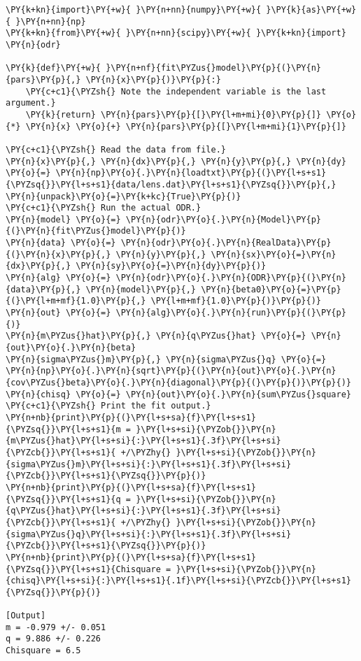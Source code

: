 \begin{Verbatim}[label=\makebox{\href{https://github.com/unipi-physics-labs/statnotes/tree/main/snippy/odr.py}{https://github.com/.../odr.py}},commandchars=\\\{\}]
\PY{k+kn}{import}\PY{+w}{ }\PY{n+nn}{numpy}\PY{+w}{ }\PY{k}{as}\PY{+w}{ }\PY{n+nn}{np}
\PY{k+kn}{from}\PY{+w}{ }\PY{n+nn}{scipy}\PY{+w}{ }\PY{k+kn}{import} \PY{n}{odr}

\PY{k}{def}\PY{+w}{ }\PY{n+nf}{fit\PYZus{}model}\PY{p}{(}\PY{n}{pars}\PY{p}{,} \PY{n}{x}\PY{p}{)}\PY{p}{:}
    \PY{c+c1}{\PYZsh{} Note the independent variable is the last argument.}
    \PY{k}{return} \PY{n}{pars}\PY{p}{[}\PY{l+m+mi}{0}\PY{p}{]} \PY{o}{*} \PY{n}{x} \PY{o}{+} \PY{n}{pars}\PY{p}{[}\PY{l+m+mi}{1}\PY{p}{]}

\PY{c+c1}{\PYZsh{} Read the data from file.}
\PY{n}{x}\PY{p}{,} \PY{n}{dx}\PY{p}{,} \PY{n}{y}\PY{p}{,} \PY{n}{dy} \PY{o}{=} \PY{n}{np}\PY{o}{.}\PY{n}{loadtxt}\PY{p}{(}\PY{l+s+s1}{\PYZsq{}}\PY{l+s+s1}{data/lens.dat}\PY{l+s+s1}{\PYZsq{}}\PY{p}{,} \PY{n}{unpack}\PY{o}{=}\PY{k+kc}{True}\PY{p}{)}
\PY{c+c1}{\PYZsh{} Run the actual ODR.}
\PY{n}{model} \PY{o}{=} \PY{n}{odr}\PY{o}{.}\PY{n}{Model}\PY{p}{(}\PY{n}{fit\PYZus{}model}\PY{p}{)}
\PY{n}{data} \PY{o}{=} \PY{n}{odr}\PY{o}{.}\PY{n}{RealData}\PY{p}{(}\PY{n}{x}\PY{p}{,} \PY{n}{y}\PY{p}{,} \PY{n}{sx}\PY{o}{=}\PY{n}{dx}\PY{p}{,} \PY{n}{sy}\PY{o}{=}\PY{n}{dy}\PY{p}{)}
\PY{n}{alg} \PY{o}{=} \PY{n}{odr}\PY{o}{.}\PY{n}{ODR}\PY{p}{(}\PY{n}{data}\PY{p}{,} \PY{n}{model}\PY{p}{,} \PY{n}{beta0}\PY{o}{=}\PY{p}{(}\PY{l+m+mf}{1.0}\PY{p}{,} \PY{l+m+mf}{1.0}\PY{p}{)}\PY{p}{)}
\PY{n}{out} \PY{o}{=} \PY{n}{alg}\PY{o}{.}\PY{n}{run}\PY{p}{(}\PY{p}{)}
\PY{n}{m\PYZus{}hat}\PY{p}{,} \PY{n}{q\PYZus{}hat} \PY{o}{=} \PY{n}{out}\PY{o}{.}\PY{n}{beta}
\PY{n}{sigma\PYZus{}m}\PY{p}{,} \PY{n}{sigma\PYZus{}q} \PY{o}{=} \PY{n}{np}\PY{o}{.}\PY{n}{sqrt}\PY{p}{(}\PY{n}{out}\PY{o}{.}\PY{n}{cov\PYZus{}beta}\PY{o}{.}\PY{n}{diagonal}\PY{p}{(}\PY{p}{)}\PY{p}{)}
\PY{n}{chisq} \PY{o}{=} \PY{n}{out}\PY{o}{.}\PY{n}{sum\PYZus{}square}
\PY{c+c1}{\PYZsh{} Print the fit output.}
\PY{n+nb}{print}\PY{p}{(}\PY{l+s+sa}{f}\PY{l+s+s1}{\PYZsq{}}\PY{l+s+s1}{m = }\PY{l+s+si}{\PYZob{}}\PY{n}{m\PYZus{}hat}\PY{l+s+si}{:}\PY{l+s+s1}{.3f}\PY{l+s+si}{\PYZcb{}}\PY{l+s+s1}{ +/\PYZhy{} }\PY{l+s+si}{\PYZob{}}\PY{n}{sigma\PYZus{}m}\PY{l+s+si}{:}\PY{l+s+s1}{.3f}\PY{l+s+si}{\PYZcb{}}\PY{l+s+s1}{\PYZsq{}}\PY{p}{)}
\PY{n+nb}{print}\PY{p}{(}\PY{l+s+sa}{f}\PY{l+s+s1}{\PYZsq{}}\PY{l+s+s1}{q = }\PY{l+s+si}{\PYZob{}}\PY{n}{q\PYZus{}hat}\PY{l+s+si}{:}\PY{l+s+s1}{.3f}\PY{l+s+si}{\PYZcb{}}\PY{l+s+s1}{ +/\PYZhy{} }\PY{l+s+si}{\PYZob{}}\PY{n}{sigma\PYZus{}q}\PY{l+s+si}{:}\PY{l+s+s1}{.3f}\PY{l+s+si}{\PYZcb{}}\PY{l+s+s1}{\PYZsq{}}\PY{p}{)}
\PY{n+nb}{print}\PY{p}{(}\PY{l+s+sa}{f}\PY{l+s+s1}{\PYZsq{}}\PY{l+s+s1}{Chisquare = }\PY{l+s+si}{\PYZob{}}\PY{n}{chisq}\PY{l+s+si}{:}\PY{l+s+s1}{.1f}\PY{l+s+si}{\PYZcb{}}\PY{l+s+s1}{\PYZsq{}}\PY{p}{)}

[Output]
m = -0.979 +/- 0.051
q = 9.886 +/- 0.226
Chisquare = 6.5
\end{Verbatim}
